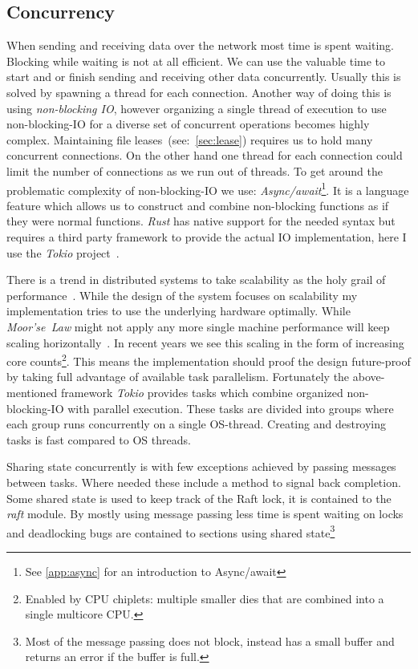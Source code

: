 \subsection{Concurrency}
When sending and receiving data over the network most time is spent waiting. Blocking while waiting is not at all efficient. We can use the valuable time to start and or finish sending and receiving other data concurrently. Usually this is solved by spawning a thread for each connection. Another way of doing this is using \textit{non-blocking IO}, however organizing a single thread of execution to use non-blocking-IO for a diverse set of concurrent operations becomes highly complex. 
Maintaining file leases~(see:~\cref{sec:lease}) requires us to hold many concurrent connections. On the other hand one thread for each connection could limit the number of connections as we run out of threads. To get around the problematic complexity of non-blocking-IO we use: \textit{Async/await}\footnote{See \cref{app:async} for an introduction to Async/await}. It is a language feature which allows us to construct and combine non-blocking functions as if they were normal functions. \textit{Rust} has native support for the needed syntax but requires a third party framework to provide the actual IO implementation, here I use the \textit{Tokio} project~\cite{tokio}.

There is a trend in distributed systems to take scalability as the holy grail of performance~\cite{scaling}. While the design of the system focuses on scalability my implementation tries to use the underlying hardware optimally. 
While \textit{Moor'se~Law} might not apply any more single machine performance will keep scaling horizontally~\cite{moore}. In recent years we see this scaling in the form of increasing core counts\footnote{Enabled by CPU chiplets: multiple smaller dies that are combined into a single multicore CPU.}. This means the implementation should proof the design future-proof by taking full advantage of available task parallelism. Fortunately the above-mentioned framework \textit{Tokio} provides tasks which combine organized non-blocking-IO with parallel execution. These tasks are divided into groups where each group runs concurrently on a single OS-thread. Creating and destroying tasks is fast compared to OS threads.

Sharing state concurrently is with few exceptions achieved by passing messages between tasks. Where needed these include a method to signal back completion. Some shared state is used to keep track of the Raft lock, it is contained to the \textsl{raft} module. By mostly using message passing less time is spent waiting on locks and deadlocking bugs are contained to sections using shared state\footnote{Most of the message passing does not block, instead has a small buffer and returns an error if the buffer is full.} 

